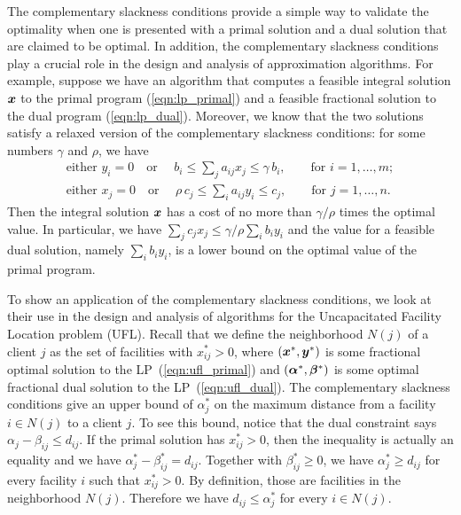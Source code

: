 \documentclass[oneside,final]{ucr}
\begin{document}
The complementary slackness conditions provide a simple way
to validate the optimality when one is presented with a
primal solution and a dual solution that are claimed to be
optimal. In addition, the complementary slackness conditions
play a crucial role in the design and analysis of
approximation algorithms. For example, suppose we have an
algorithm that computes a feasible integral solution $\boldsymbol{x}$
to the primal program (\ref{eqn:lp_primal}) and a feasible
fractional solution to the dual program
(\ref{eqn:lp_dual}). Moreover, we know that the two
solutions satisfy a relaxed version of the complementary
slackness conditions: for some numbers $\gamma$ and $\rho$,
we have
\begin{align*}
  \text{either } y_i = 0  \quad \text{or } \quad b_i \leq \sum_{j}
  a_{ij} x_j \leq \gamma\, b_i, \qquad \text{for } i = 1,
  \ldots, m;\\
  \text{either } x_j = 0  \quad \text{or } \quad \rho\, c_j \leq
  \sum_{i}a_{ij}y_i \leq c_j, \qquad \text{for } j = 1,
  \ldots, n.
\end{align*}
Then the integral solution $\boldsymbol{x}$ has a cost of no more than
$\gamma/\rho$ times the optimal value. In particular, we
have $\sum_{j} c_j x_j \leq \gamma/\rho \sum_{i} b_i y_i$
and the value for a feasible dual solution, namely $\sum_{i}
b_i y_i$, is a lower bound on the optimal value of the
primal program.

To show an application of the complementary slackness
conditions, we look at their use in the design and analysis
of algorithms for the Uncapacitated Facility Location
problem (UFL). Recall that we define the neighborhood $N(j)$
of a client $j$ as the set of facilities with $x_{ij}^\ast >
0$, where $(\boldsymbol{x}^\ast,\boldsymbol{y}^\ast)$ is some fractional optimal
solution to the LP~(\ref{eqn:ufl_primal}) and
$(\boldsymbol{\alpha}^\ast, \boldsymbol{\beta}^\ast)$ is some optimal fractional
dual solution to the LP~(\ref{eqn:ufl_dual}). The
complementary slackness conditions give an upper bound of
$\alpha_j^\ast$ on the maximum distance from a facility $i
\in N(j)$ to a client $j$. To see this bound, notice that
the dual constraint says $\alpha_j - \beta_{ij} \leq
d_{ij}$.  If the primal solution has $x_{ij}^\ast > 0$, then
the inequality is actually an equality and we have
$\alpha_j^\ast - \beta_{ij}^\ast = d_{ij}$. Together with
$\beta_{ij}^\ast \geq 0$, we have $\alpha_j^\ast \geq
d_{ij}$ for every facility $i$ such that $x_{ij}^\ast >
0$. By definition, those are facilities in the neighborhood
$N(j)$. Therefore we have $d_{ij} \leq \alpha_j^\ast$ for
every $i\in N(j)$.
\end{document}
